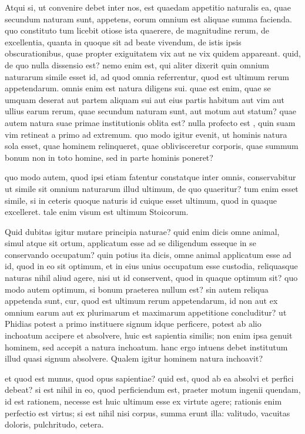  Atqui si, ut convenire debet inter nos, est quaedam appetitio naturalis ea, quae secundum naturam sunt, appetens, eorum omnium est aliquae summa facienda. quo constituto tum licebit otiose ista quaerere, de magnitudine rerum, de excellentia, quanta in quoque sit ad beate vivendum, de istis ipsis obscurationibus, quae propter exiguitatem vix aut ne vix quidem appareant. quid, de quo nulla dissensio est? nemo enim est, qui aliter dixerit quin omnium naturarum simile esset id, ad quod omnia referrentur, quod est ultimum rerum appetendarum. omnis enim est natura diligens sui. quae est enim, quae se umquam deserat aut partem aliquam sui aut eius partis habitum aut vim aut ullius earum rerum, quae secundum naturam sunt, aut motum aut statum? quae autem natura suae primae institutionis oblita est? nulla profecto est , quin suam vim retineat a primo ad extremum. quo modo igitur evenit, ut hominis natura sola esset, quae hominem relinqueret, quae oblivisceretur corporis, quae summum bonum non in toto homine, sed in parte hominis poneret?

 quo modo autem, quod ipsi etiam fatentur constatque inter omnis, conservabitur ut simile sit omnium naturarum illud ultimum, de quo quaeritur? tum enim esset simile, si in ceteris quoque naturis id cuique esset ultimum, quod in quaque excelleret. tale enim visum est ultimum Stoicorum.

 Quid dubitas igitur mutare principia naturae? quid enim dicis omne animal, simul atque sit ortum, applicatum esse ad se diligendum esseque in se conservando occupatum? quin potius ita dicis, omne animal applicatum esse ad id, quod in eo sit optimum, et in eius unius occupatum esse custodia, reliquasque naturas nihil aliud agere, nisi ut id conservent, quod in quaque optimum sit? quo modo autem optimum, si bonum praeterea nullum est? sin autem reliqua appetenda sunt, cur, quod est ultimum rerum appetendarum, id non aut ex omnium earum aut ex plurimarum et maximarum appetitione concluditur? ut Phidias potest a primo instituere signum idque perficere, potest ab alio inchoatum accipere et absolvere, huic est sapientia similis; non enim ipsa genuit hominem, sed accepit a natura inchoatum. hanc ergo intuens debet institutum illud quasi signum absolvere. Qualem igitur hominem natura inchoavit?

 et quod est munus, quod opus sapientiae? quid est, quod ab ea absolvi et perfici debeat? si est nihil in eo, quod perficiendum est, praeter motum ingenii quendam, id est rationem, necesse est huic ultimum esse ex virtute agere; rationis enim perfectio est virtus; si est nihil nisi corpus, summa erunt illa: valitudo, vacuitas doloris, pulchritudo, cetera.

